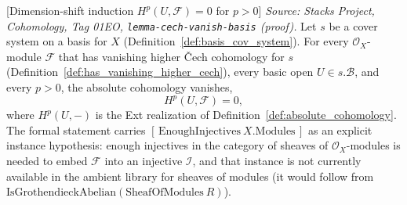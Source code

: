 \begin{lemma}

[Dimension-shift induction \(H^p(U, \mathcal{F}) = 0\) for \(p > 0\)]
  \label{lem:absolute_cohomology_pos_vanishing}
  \textit{Source: Stacks Project, Cohomology, Tag 01EO,
  \texttt{lemma-cech-vanish-basis} (proof).}
  Let \(s\) be a cover system on a basis for \(X\) (Definition~\ref{def:basis_cov_system}). For every
  \(\mathcal{O}_X\)-module \(\mathcal{F}\) that has vanishing higher {\v C}ech cohomology for \(s\)
  (Definition~\ref{def:has_vanishing_higher_cech}), every basic open \(U \in s.\mathcal{B}\), and
  every \(p > 0\), the absolute cohomology vanishes,
  \[
    H^p(U, \mathcal{F}) = 0,
  \]
  where \(H^p(U, -)\) is the Ext realization of Definition~\ref{def:absolute_cohomology}. The
  formal statement carries \([\,\mathrm{EnoughInjectives}\ X.\mathrm{Modules}\,]\) as an explicit
  instance hypothesis: enough injectives in the category of sheaves of
  \(\mathcal{O}_X\)-modules is needed to embed \(\mathcal{F}\) into an injective \(\mathcal{I}\), and
  that instance is not currently available in the ambient library for sheaves of modules (it would
  follow from \(\mathrm{IsGrothendieckAbelian}(\mathrm{SheafOfModules}\ R)\)).
\end{lemma}

